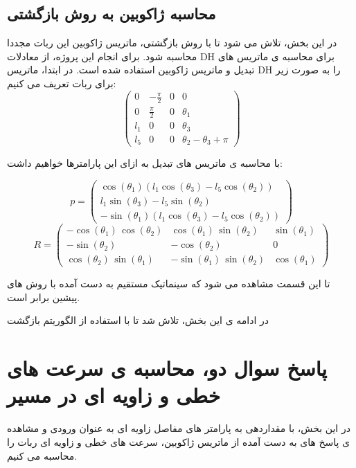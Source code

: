 \subsection{محاسبه ژاکوبین به روش  بازگشتی}
در این بخش، تلاش می شود تا با روش بازگشتی، ماتریس ژاکوبین این ربات مجددا محاسبه شود. برای انجام این پروژه، از معادلات DH برای محاسبه ی ماتریس های تبدیل و ماتریس ژاکوبین استفاده شده است.
در ابتدا، ماتریس DH را به صورت زیر برای ربات تعریف می کنیم:
\[
\begin{pmatrix}
	0 & -\frac{\pi}{2} & 0 & 0 \\
	0 & \frac{\pi}{2} & 0 & \theta_1 \\
	l_1 & 0 & 0 & \theta_3 \\
	l_5 & 0 & 0 & \theta_2 - \theta_3 + \pi
\end{pmatrix}
\]

با محاسبه ی ماتریس های تبدیل به ازای این پارامترها خواهیم داشت:
 
\[
p =
\begin{pmatrix}
	\cos \left(\theta_1 \right)\left(l_1 \cos \left(\theta_3 \right)-l_5 \cos \left(\theta_2 \right)\right) \\
	l_1 \sin \left(\theta_3 \right)-l_5 \sin \left(\theta_2 \right) \\
	-\sin \left(\theta_1 \right)\left(l_1 \cos \left(\theta_3 \right)-l_5 \cos \left(\theta_2 \right)\right)
\end{pmatrix}
\]
\[
R = 
\begin{pmatrix}
	-\cos \left(\theta_1 \right)\,\cos \left(\theta_2 \right) & \cos \left(\theta_1 \right)\,\sin \left(\theta_2 \right) & \sin \left(\theta_1 \right) \\
	-\sin \left(\theta_2 \right) & -\cos \left(\theta_2 \right) & 0 \\
	\cos \left(\theta_2 \right)\,\sin \left(\theta_1 \right) & -\sin \left(\theta_1 \right)\,\sin \left(\theta_2 \right) & \cos \left(\theta_1 \right)
\end{pmatrix}
\]

تا این قسمت مشاهده می شود که سینماتیک مستقیم به دست آمده با روش های پیشین برابر است.

در ادامه ی این بخش، تلاش شد تا با استفاده از الگوریتم بازگشت




\section*{پاسخ سوال دو، محاسبه ی سرعت های خطی و زاویه ای در مسیر}
در این بخش، با مقداردهی به پارامتر های مفاصل زاویه ای به عنوان ورودی و مشاهده ی پاسخ های به دست آمده از ماتریس ژاکوبین، سرعت های خطی و زاویه ای ربات را محاسبه می کنیم.

